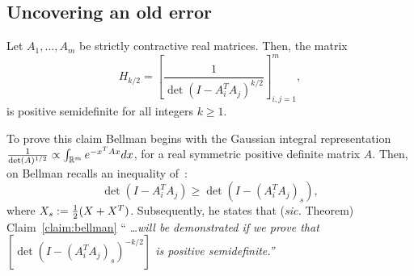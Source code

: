 \documentclass[11pt]{article}
\begin{document}
\subsection{Uncovering an old error}
\begin{claim}
  \label{claim:bellman}
  Let $A_1,\ldots,A_m$ be strictly contractive real matrices. Then, the matrix
  \begin{equation}
    \label{eq:bell}
    H_{k/2} = \left[\frac{1}{\det(I-A_i^TA_j)^{k/2}} \right]_{i,j=1}^m,
  \end{equation}
  is positive semidefinite for all integers $k\ge 1$.
\end{claim}
\noindent To prove this claim Bellman begins with the Gaussian integral representation %
$\frac{1}{\det(A)^{1/2}}  \propto \int_{\mathbb{R}^m} e^{-x^TAx}dx$, %
for a real symmetric positive definite matrix $A$. Then, on \citep[pg.~488, (7.6)]{bellman1959} Bellman recalls an inequality of~\citet{ostrow1951}:
\begin{equation}
  \label{eq:6}
  \det(I-A_i^TA_j) \ge \det(I - (A_i^TA_j)_s),
\end{equation}
where $X_s := \tfrac{1}{2}(X+X^T)$. Subsequently, he  states that (\emph{sic.} Theorem) Claim~\ref{claim:bellman} ``{\it
  \ldots will be demonstrated if we prove that $[\det(I - (A_i^TA_j)_s)^{-k/2}]$ is positive semidefinite.''}
\end{document}
